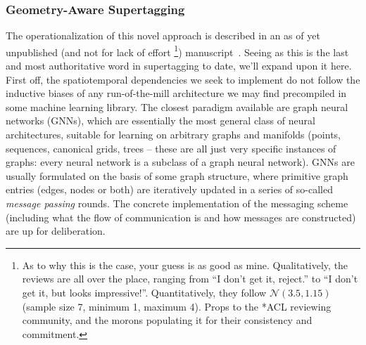 \subsubsection{Geometry-Aware Supertagging}
\label{subsubsection:gas}
The operationalization of this novel approach is described in an as of yet unpublished (and not for lack of effort%
\footnote{As to why this is the case, your guess is as good as mine. Qualitatively, the reviews are all over the place, ranging from ``I don't get it, reject.'' to ``I don't get it, but looks impressive!''. Quantitatively, they follow $\mathcal{N}(3.5, 1.15)$ (sample size 7, minimum 1, maximum 4). Props to the *ACL reviewing community, and the morons populating it for their consistency and commitment.})
manuscript~\cite{kogkalidis2022geometryaware}.
Seeing as this is the last and most authoritative word in supertagging to date, we'll expand upon it here.
First off, the spatiotemporal dependencies we seek to implement do not follow the inductive biases of any run-of-the-mill architecture we may find precompiled in some machine learning library.
The closest paradigm available are graph neural networks (GNNs), which are essentially the most general class of neural architectures, suitable for learning on arbitrary graphs and manifolds (points, sequences, canonical grids, trees -- these are all just very specific instances of graphs: every neural network is a subclass of a graph neural network).
GNNs are usually formulated on the basis of some graph structure, where primitive graph entries (edges, nodes or both) are iteratively updated in a series of so-called \textit{message passing} rounds.
The concrete implementation of the messaging scheme (including what the flow of communication is and how messages are constructed) are up for deliberation.

